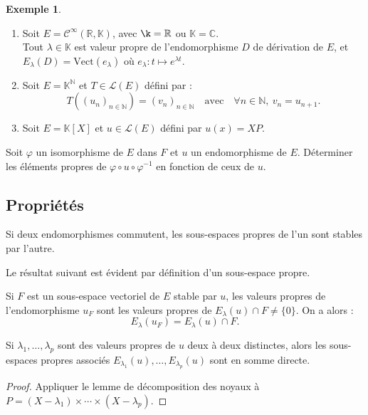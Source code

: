 \documentclass[french]{article}
\newcommand{\N}{\mathbb{N}}
\newcommand{\R}{\mathbb{R}}
\newcommand{\C}{\mathbb{C}}
\newcommand{\K}{\mathbb{K}}
\newcommand{\inv}{^{-1}}
\newcommand{\Vect}{\text{Vect}}
\theoremstyle{plain}
\theoremstyle{definition}
\newtheorem*{ex}{Exemple}
\theoremstyle{remark}
\begin{document}
	\begin{ex}
		\begin{enumerate}
			\item Soit $E=\mathcal{C}^\infty(\R,\K)$, avec $\k=\R$ ou $\K=\C$. \\
			Tout $\lambda\in\K$ est valeur propre de l'endomorphisme $D$ de dérivation de $E$, et $E_\lambda(D)=\Vect(e_\lambda)$ où $e_\lambda:t\mapsto e^{\lambda t}$.
			\item Soit $E=\K^\N$ et $T\in\mathcal{L}(E)$ défini par :
			$$T((u_n)_{n\in\N})=(v_n)_{n\in\N}\quad\text{avec}\quad \forall n\in\N,\ v_n=u_{n+1}.$$
			\item Soit $E=\K[X]$ et $u\in\mathcal{L}(E)$ défini par $u(x)=XP$.
		\end{enumerate}
	\end{ex}
	
	\begin{exo}
		Soit $\varphi$ un isomorphisme de $E$ dans $F$ et $u$ un endomorphisme de $E$. Déterminer les éléments propres de $\varphi\circ u\circ\varphi\inv$ en fonction de ceux de $u$.
	\end{exo}
	
	\subsection{Propriétés}
	
	\begin{prop}%
		Si deux endomorphismes commutent, les sous-espaces propres de l'un sont stables par l'autre.
	\end{prop}
	
	Le résultat suivant est évident par définition d'un sous-espace propre.
	
	\begin{prop}%
		Si $F$ est un sous-espace vectoriel de $E$ stable par $u$, les valeurs propres de l'endomorphisme $u_F$ sont les valeurs propres de $E_\lambda(u)\cap F\ne\{0\}$. On a alors : $$E_\lambda(u_F)=E_\lambda(u)\cap F.$$
	\end{prop}
	
	\begin{prop}%
		Si $\lambda_1,\ldots,\lambda_p$ sont des valeurs propres de $u$ deux à deux distinctes, alors les sous-espaces propres associés $E_{\lambda_1}(u),\ldots,E_{\lambda_p}(u)$ sont en somme directe.
	\end{prop}
	\begin{proof}
		Appliquer le lemme de décomposition des noyaux à $P=(X-\lambda_1)\times\cdots\times(X-\lambda_p)$.
	\end{proof}
	
\end{document}
